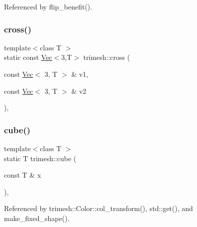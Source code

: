 Referenced by flip\+\_\+benefit().

\mbox{\label{namespacetrimesh_a64d53b3f3dbbac7e91cdda30cda6e440}} 
\subsubsection{\texorpdfstring{cross()}{cross()}}
{\footnotesize\ttfamily template$<$class T $>$ \\
static const \hyperlink{classtrimesh_1_1Vec}{Vec}$<$3,T$>$ trimesh\+::cross (\begin{DoxyParamCaption}\item[{const \hyperlink{classtrimesh_1_1Vec}{Vec}$<$ 3, T $>$ \&}]{v1,  }\item[{const \hyperlink{classtrimesh_1_1Vec}{Vec}$<$ 3, T $>$ \&}]{v2 }\end{DoxyParamCaption})\hspace{0.3cm}{\ttfamily [inline]}, {\ttfamily [static]}}

\mbox{\label{namespacetrimesh_ab10142c482d70b93786d10a1fe716690}} 
\subsubsection{\texorpdfstring{cube()}{cube()}}
{\footnotesize\ttfamily template$<$class T $>$ \\
static T trimesh\+::cube (\begin{DoxyParamCaption}\item[{const T \&}]{x }\end{DoxyParamCaption})\hspace{0.3cm}{\ttfamily [inline]}, {\ttfamily [static]}}



Referenced by trimesh\+::\+Color\+::col\+\_\+transform(), std\+::get(), and make\+\_\+fixed\+\_\+shape().

\mbox{\label{namespacetrimesh_a1babcab4e1f2d085678ef77689beabbf}} 
